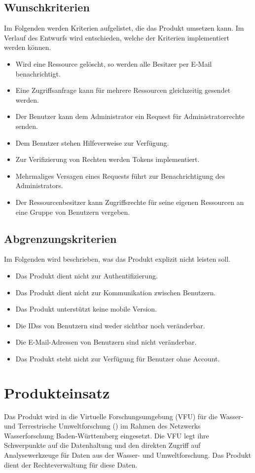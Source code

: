 \documentclass[parskip=full,11pt]{scrartcl}
\begin{document}
\subsection{Wunschkriterien}
Im Folgenden werden Kriterien aufgelistet, die das Produkt umsetzen kann.
Im Verlauf des Entwurfs wird entschieden, welche der Kriterien  implementiert werden können.
\begin{itemize}[itemsep=0pt]
\item Wird eine Ressource gelöscht, so werden alle Besitzer per E-Mail benachrichtigt. 
\item Eine Zugriffsanfrage kann für mehrere Ressourcen gleichzeitig gesendet werden.
\item Der Benutzer kann dem Administrator ein Request für Administratorrechte senden.
\item Dem Benutzer stehen Hilfeverweise zur Verfügung.
\item Zur Verifizierung von Rechten werden \glspl{Token} implementiert.
\item Mehrmaliges Versagen eines Requests führt zur Benachrichtigung des Administrators.
\item Der Ressourcenbesitzer kann Zugriffsrechte für seine eigenen Ressourcen an eine Gruppe von Benutzern vergeben.
\end{itemize}
\newpage
\subsection{Abgrenzungskriterien}
Im Folgenden wird beschrieben, was das Produkt explizit nicht leisten soll.
\begin{itemize}[itemsep=0pt]
\item Das Produkt dient nicht zur Authentifizierung.
\item Das Produkt dient nicht zur Kommunikation zwischen Benutzern.
\item Das Produkt unterstützt keine mobile Version.
\item Die \glspl{IDs} von Benutzern sind weder sichtbar noch veränderbar.
\item Die E-Mail-Adressen von Benutzern sind nicht veränderbar.
\item Das Produkt steht nicht zur Verfügung für Benutzer ohne Account.
\end{itemize}


\section{Produkteinsatz}
Das Produkt wird in die Virtuelle Forschungsumgebung (VFU) für die Wasser-
und Terrestrische Umweltforschung (\grqq) im Rahmen des Netzwerks
Wasserforschung Baden-Württemberg eingesetzt. Die VFU legt ihre Schwerpunkte
auf die Datenhaltung und den direkten Zugriff auf Analysewerkzeuge für Daten
aus der Wasser- und Umweltforschung. Das Produkt dient der
Rechteverwaltung für diese Daten.
\end{document}
